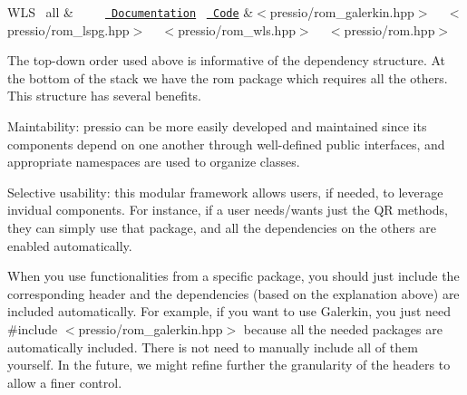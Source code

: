 \begin{longtabu}
 WLS~\newline
 all   &~\newline
~\newline
~\newline
\href{md_pages_components_rom.html}{\texttt{ Documentation}}~\newline
\href{https://github.com/Pressio/pressio/tree/main/include/rom}{\texttt{ Code}}   &{\ttfamily $<$pressio/rom\+\_\+galerkin.\+hpp$>$} ~\newline
 {\ttfamily $<$pressio/rom\+\_\+lspg.\+hpp$>$} ~\newline
 {\ttfamily $<$pressio/rom\+\_\+wls.\+hpp$>$} ~\newline
 {\ttfamily $<$pressio/rom.\+hpp$>$}   \\
\end{longtabu}


The top-\/down order used above is informative of the dependency structure. At the bottom of the stack we have the {\ttfamily rom} package which requires all the others. This structure has several benefits.
\begin{DoxyItemize}
\item Maintability\+: {\ttfamily pressio} can be more easily developed and maintained since its components depend on one another through well-\/defined public interfaces, and appropriate namespaces are used to organize classes.
\item Selective usability\+: this modular framework allows users, if needed, to leverage invidual components. For instance, if a user needs/wants just the QR methods, they can simply use that package, and all the dependencies on the others are enabled automatically.
\end{DoxyItemize}



\begin{DoxyParagraph}{}
When you use functionalities from a specific package, you should just include the corresponding header and the dependencies (based on the explanation above) are included automatically. For example, if you want to use Galerkin, you just need {\ttfamily \#include $<$pressio/rom\+\_\+galerkin.\+hpp$>$} because all the needed packages are automatically included. There is not need to manually include all of them yourself. In the future, we might refine further the granularity of the headers to allow a finer control. 
\end{DoxyParagraph}
